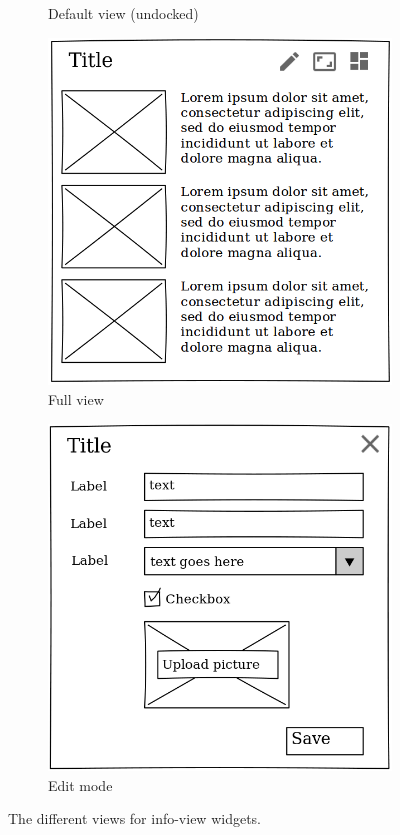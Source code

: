 \documentclass{sigchi}
\begin{document}
\begin{figure}
\begin{subfigure}{0.4\columnwidth}
		\caption{Default view (undocked)}
		\label{fig:widget-default-undocked}
	\end{subfigure}
	\hfill
	\begin{subfigure}{0.4\columnwidth}
		\includegraphics[width=\textwidth]{figures/widget-full}
		\caption{Full view}
		\label{fig:widget-full}
	\end{subfigure}
	\hfill
	\begin{subfigure}{0.4\columnwidth}
		\includegraphics[width=\textwidth]{figures/widget-editmode}
		\caption{Edit mode}
		\label{fig:widget-editmode}
	\end{subfigure}
	
	\caption{The different views for info-view widgets.}
	\label{fig:infoview-widgets}
\end{figure}
\end{document}
